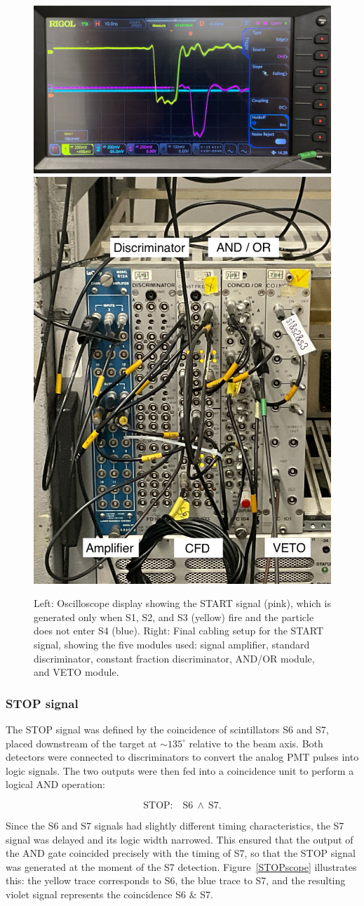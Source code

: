 \documentclass[11pt,a4paper]{article}
\begin{document}
\begin{figure}[h]
    \centering
    \includegraphics[width=0.48\linewidth]{VETO 4.jpeg}
    \includegraphics[width=0.28\linewidth]{START.jpeg}
    \caption{Left: Oscilloscope display showing the START signal (pink), which is generated only when S1, S2, and S3 (yellow) fire and the particle does not enter S4 (blue). Right: Final cabling setup for the START signal, showing the five modules used: signal amplifier, standard discriminator, constant fraction discriminator, AND/OR module, and VETO module.}
    \label{final}
\end{figure}

\subsubsection{STOP signal}


The STOP signal was defined by the coincidence of scintillators S6 and S7, placed downstream of the target at $\sim 135^\circ$ relative to the beam axis. Both detectors were connected to discriminators to convert the analog PMT pulses into logic signals. The two outputs were then fed into a coincidence unit to perform a logical AND operation:

\begin{equation*}
\text{STOP:} \quad \text{S6} \: \land \: \text{S7}.
\end{equation*}

Since the S6 and S7 signals had slightly different timing characteristics, the S7 signal was delayed and its logic width narrowed. This ensured that the output of the AND gate coincided precisely with the timing of S7, so that the STOP signal was generated at the moment of the S7 detection. Figure~\ref{STOPscope} illustrates this: the yellow trace corresponds to S6, the blue trace to S7, and the resulting violet signal represents the coincidence S6 $\&$ S7.
\end{document}
